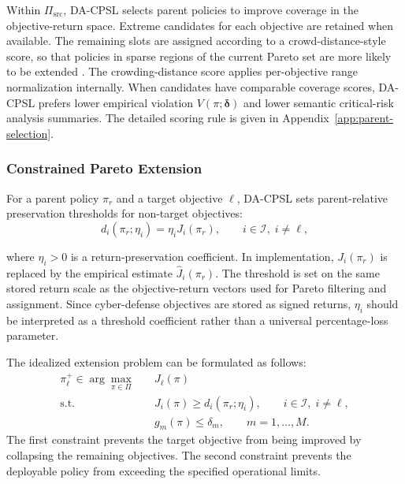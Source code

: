 \documentclass[sigconf,review,anonymous]{acmart}
\begin{document}
Within \(\Pi_{\mathrm{src}}\), DA-CPSL selects parent policies to improve
coverage in the objective-return space. Extreme candidates for each
objective are retained when available. The remaining slots are assigned
according to a crowd-distance-style score, so that policies in sparse
regions of the current Pareto set are more likely to be extended
\cite{deb2002nsga2,liu2025cmorl}. The crowding-distance score applies
per-objective range normalization internally. When candidates have
comparable coverage scores, DA-CPSL prefers lower empirical violation
\(V(\pi;\boldsymbol{\delta})\) and lower semantic critical-risk analysis
summaries. The detailed scoring rule is given in
Appendix~\ref{app:parent-selection}.

\subsubsection{Constrained Pareto Extension}
\label{subsubsec:constrained-pareto-extension}


For a parent policy \(\pi_r\) and a target objective \(\ell\), DA-CPSL sets parent-relative preservation
thresholds for non-target objectives:
\begin{equation}
d_i(\pi_r;\eta_i)
=
\eta_i
J_i(\pi_r),
\qquad
i\in\mathcal{I},\; i\neq \ell ,
\label{eq:parent-relative-threshold}
\end{equation}

where \(\eta_i>0\) is a return-preservation coefficient. In
implementation, \(J_i(\pi_r)\) is replaced by the empirical estimate
\(\widehat{J}_i(\pi_r)\). The threshold is set on the same stored return
scale as the objective-return vectors used for Pareto filtering and
assignment. Since cyber-defense objectives are stored as signed returns,
\(\eta_i\) should be interpreted as a threshold coefficient rather than a
universal percentage-loss parameter.

The idealized extension problem can be formulated as follows:
\begin{align}
\pi_{\ell}^{+}
\in
\arg\max_{\pi\in\mathcal{\Pi}}
&\quad
J_{\ell}(\pi)
\label{eq:ideal-extension}
\\
\mathrm{s.t.}
&\quad
J_{i}(\pi)
\geq
d_i(\pi_r;\eta_i),
\qquad
i\in\mathcal{I},\; i\neq \ell ,
\nonumber\\
&\quad
g_m(\pi)
\leq
\delta_m,
\qquad
m=1,\ldots,M .
\nonumber
\end{align}
The first constraint prevents the target objective from being improved by collapsing the remaining objectives.
The second constraint prevents the deployable policy from exceeding the specified operational limits.
\end{document}
